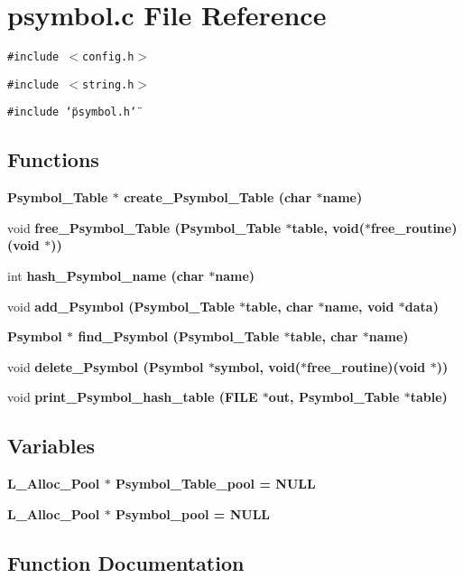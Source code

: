 \section{psymbol.c File Reference}
\label{psymbol_8c}
{\tt \#include $<$config.h$>$}\par
{\tt \#include $<$string.h$>$}\par
{\tt \#include \char`\"{}psymbol.h\char`\"{}}\par
\subsection*{Functions}
\begin{CompactItemize}
\item 
\bf{Psymbol\_\-Table} $\ast$ \bf{create\_\-Psymbol\_\-Table} (char $\ast$\bf{name})
\item 
void \bf{free\_\-Psymbol\_\-Table} (\bf{Psymbol\_\-Table} $\ast$table, void($\ast$free\_\-routine)(void $\ast$))
\item 
int \bf{hash\_\-Psymbol\_\-name} (char $\ast$\bf{name})
\item 
void \bf{add\_\-Psymbol} (\bf{Psymbol\_\-Table} $\ast$table, char $\ast$\bf{name}, void $\ast$data)
\item 
\bf{Psymbol} $\ast$ \bf{find\_\-Psymbol} (\bf{Psymbol\_\-Table} $\ast$table, char $\ast$\bf{name})
\item 
void \bf{delete\_\-Psymbol} (\bf{Psymbol} $\ast$symbol, void($\ast$free\_\-routine)(void $\ast$))
\item 
void \bf{print\_\-Psymbol\_\-hash\_\-table} (FILE $\ast$\bf{out}, \bf{Psymbol\_\-Table} $\ast$table)
\end{CompactItemize}
\subsection*{Variables}
\begin{CompactItemize}
\item 
\bf{L\_\-Alloc\_\-Pool} $\ast$ \bf{Psymbol\_\-Table\_\-pool} = \bf{NULL}
\item 
\bf{L\_\-Alloc\_\-Pool} $\ast$ \bf{Psymbol\_\-pool} = \bf{NULL}
\end{CompactItemize}


\subsection{Function Documentation}
